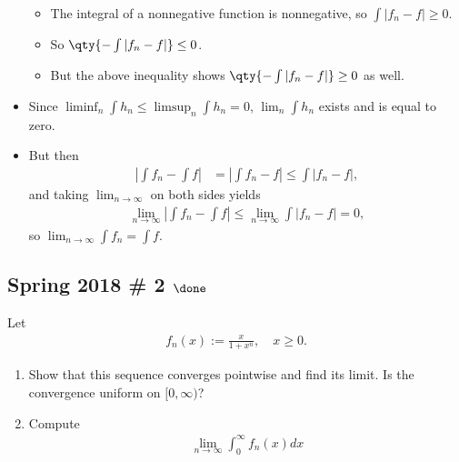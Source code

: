 \begin{solution}
\begin{itemize}
  \begin{itemize}
  \tightlist
  \item
    The integral of a nonnegative function is nonnegative, so
    \(\int {\left\lvert {f_n - f} \right\rvert} \geq 0\).
  \item
    So \(\qty{ -\int {\left\lvert {f_n - f} \right\rvert} } \leq 0\).
  \item
    But the above inequality shows
    \(\qty{ -\int {\left\lvert {f_n - f} \right\rvert} } \geq 0\) as
    well.
  \end{itemize}
\item
  Since \(\liminf_n \int h_n \leq \limsup_n \int h_n = 0\),
  \(\lim_n \int h_n\) exists and is equal to zero.
\item
  But then
  \begin{align*}
  {\left\lvert {\int f_n - \int f} \right\rvert}
  &= {\left\lvert {\int f_n -f} \right\rvert}
  \leq \int {\left\lvert {f_n - f} \right\rvert}
  ,\end{align*}
  and taking \(\lim_{n\to\infty}\) on both sides yields
  \begin{align*}
  \lim_{n\to\infty} {\left\lvert {\int f_n - \int f} \right\rvert} \leq \lim_{n\to\infty} \int {\left\lvert {f_n - f} \right\rvert} = 0
  ,\end{align*}
  so \(\lim_{n\to\infty} \int f_n = \int f\).
\end{itemize}

\end{solution}

\hypertarget{spring-2018-2-done}{%
\subsection{\texorpdfstring{Spring 2018 \# 2
\(\done\)}{Spring 2018 \# 2 \textbackslash done}}\label{spring-2018-2-done}}

Let
\begin{align*}
f_{n}(x):=\frac{x}{1+x^{n}}, \quad x \geq 0.
\end{align*}

\begin{enumerate}
\def\labelenumi{\alph{enumi}.}
\item
  Show that this sequence converges pointwise and find its limit. Is the
  convergence uniform on \([0, \infty)\)?
\item
  Compute
  \begin{align*}
  \lim _{n \rightarrow \infty} \int_{0}^{\infty} f_{n}(x) d x
  \end{align*}
\end{enumerate}

